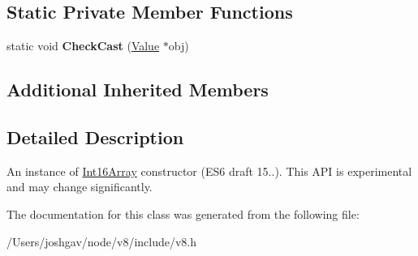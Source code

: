 \subsection*{Static Private Member Functions}
\begin{DoxyCompactItemize}
\item 
static void {\bfseries Check\+Cast} (\hyperlink{classv8_1_1_value}{Value} $\ast$obj)\hypertarget{classv8_1_1_int16_array_a893e79720d8b2fa2384a2daa36794769}{}\label{classv8_1_1_int16_array_a893e79720d8b2fa2384a2daa36794769}

\end{DoxyCompactItemize}
\subsection*{Additional Inherited Members}


\subsection{Detailed Description}
An instance of \hyperlink{classv8_1_1_int16_array}{Int16\+Array} constructor (E\+S6 draft 15..). This A\+PI is experimental and may change significantly. 

The documentation for this class was generated from the following file\+:\begin{DoxyCompactItemize}
\item 
/\+Users/joshgav/node/v8/include/v8.\+h\end{DoxyCompactItemize}
